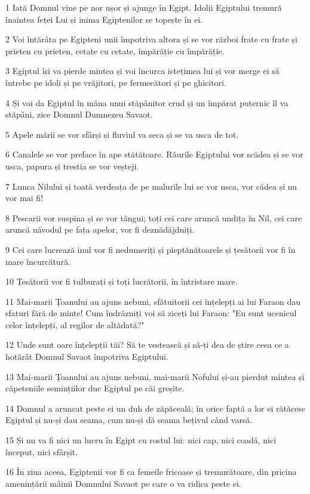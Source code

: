\par 1 Iată Domnul vine pe nor ușor și ajunge în Egipt. Idolii Egiptului tremură înaintea feței Lui și inima Egiptenilor se topește în ei.
\par 2 Voi întărâta pe Egipteni unii împotriva altora și se vor război frate cu frate și prieten cu prieten, cetate cu cetate, împărăție cu împărăție.
\par 3 Egiptul își va pierde mintea și voi încurca istețimea lui și vor merge ei să întrebe pe idoli și pe vrăjitori, pe fermecători și pe ghicitori.
\par 4 Și voi da Egiptul în mâna unui stăpânitor crud și un împărat puternic îl va stăpâni, zice Domnul Dumnezeu Savaot.
\par 5 Apele mării se vor sfârși și fluviul va seca și se va usca de tot.
\par 6 Canalele se vor preface în ape stătătoare. Râurile Egiptului vor scădea și se vor usca, papura și trestia se vor veșteji.
\par 7 Lunca Nilului și toată verdeața de pe malurile lui se vor usca, vor cădea și nu vor mai fi!
\par 8 Pescarii vor suspina și se vor tângui; toți cei care aruncă undița în Nil, cei care aruncă năvodul pe fața apelor, vor fi deznădăjduiți.
\par 9 Cei care lucrează inul vor fi nedumeriți și pieptănătoarele și țesătorii vor fi în mare încurcătură.
\par 10 Țesătorii vor fi tulburați și toți lucrătorii, în întristare mare.
\par 11 Mai-marii Țoanului au ajuns nebuni, sfătuitorii cei înțelepți ai lui Faraon dau sfaturi fără de minte! Cum îndrăzniți voi să ziceți lui Faraon: "Eu sunt ucenicul celor înțelepți, al regilor de altădată?"
\par 12 Unde sunt oare înțelepții tăi? Să te vestească și să-ți dea de știre ceea ce a hotărât Domnul Savaot împotriva Egiptului.
\par 13 Mai-marii Țoanului au ajuns nebuni, mai-marii Nofului și-au pierdut mintea și căpeteniile semințiilor duc Egiptul pe căi greșite.
\par 14 Domnul a aruncat peste ei un duh de zăpăceală; în orice faptă a lor ei rătăcesc Egiptul și nu-și dau seama, cum nu-și dă seama bețivul când varsă.
\par 15 Și nu va fi nici un lucru în Egipt cu rostul lui: nici cap, nici coadă, nici început, nici sfârșit.
\par 16 În ziua aceea, Egiptenii vor fi ca femeile fricoase și tremurătoare, din pricina amenințării mâinii Domnului Savaot pe care o va ridica peste ei.
